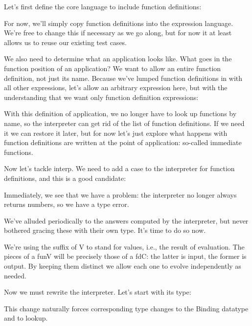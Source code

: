 
Let’s first define the core language to include function definitions:

For now, we’ll simply copy function definitions into the expression language.
We’re free to change this if necessary as we go along, but for now it at least
allows us to reuse our existing test cases.

We also need to determine what an application looks like. What goes in the
function position of an application? We want to allow an entire function
definition, not just its name. Because we’ve lumped function definitions in with
all other expressions, let’s allow an arbitrary expression here, but with the
understanding that we want only function definition expressions:

With this definition of application, we no longer have to look up functions by
name, so the interpreter can get rid of the list of function definitions. If we
need it we can restore it later, but for now let’s just explore what happens
with function definitions are written at the point of application: so-called
immediate functions.

Now let’s tackle interp. We need to add a case to the interpreter for function
definitions, and this is a good candidate:

Immediately, we see that we have a problem: the interpreter no longer always
returns numbers, so we have a type error.

We’ve alluded periodically to the answers computed by the interpreter, but never
bothered gracing these with their own type. It’s time to do so now.

We’re using the suffix of V to stand for values, i.e., the result of evaluation.
The pieces of a funV will be precisely those of a fdC: the latter is input, the
former is output. By keeping them distinct we allow each one to evolve
independently as needed.

Now we must rewrite the interpreter. Let’s start with its type:

This change naturally forces corresponding type changes to the Binding datatype
and to lookup.

